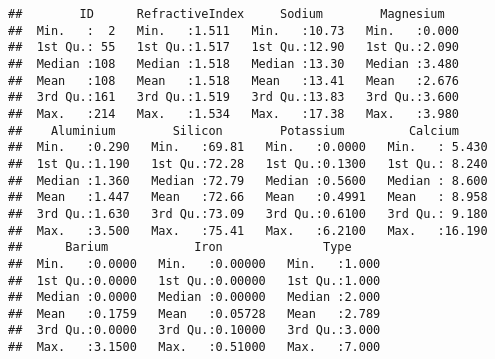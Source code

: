 \documentclass[]{article}
\newenvironment{Shaded}{\begin{snugshade}}{\end{snugshade}}
\newcommand{\KeywordTok}[1]{\textcolor[rgb]{0.13,0.29,0.53}{\textbf{#1}}}
\newcommand{\DataTypeTok}[1]{\textcolor[rgb]{0.13,0.29,0.53}{#1}}
\newcommand{\DecValTok}[1]{\textcolor[rgb]{0.00,0.00,0.81}{#1}}
\newcommand{\StringTok}[1]{\textcolor[rgb]{0.31,0.60,0.02}{#1}}
\newcommand{\CommentTok}[1]{\textcolor[rgb]{0.56,0.35,0.01}{\textit{#1}}}
\newcommand{\OperatorTok}[1]{\textcolor[rgb]{0.81,0.36,0.00}{\textbf{#1}}}
\newcommand{\NormalTok}[1]{#1}
\begin{document}
\begin{verbatim}
##        ID      RefractiveIndex     Sodium        Magnesium    
##  Min.   :  2   Min.   :1.511   Min.   :10.73   Min.   :0.000  
##  1st Qu.: 55   1st Qu.:1.517   1st Qu.:12.90   1st Qu.:2.090  
##  Median :108   Median :1.518   Median :13.30   Median :3.480  
##  Mean   :108   Mean   :1.518   Mean   :13.41   Mean   :2.676  
##  3rd Qu.:161   3rd Qu.:1.519   3rd Qu.:13.83   3rd Qu.:3.600  
##  Max.   :214   Max.   :1.534   Max.   :17.38   Max.   :3.980  
##    Aluminium        Silicon        Potassium         Calcium      
##  Min.   :0.290   Min.   :69.81   Min.   :0.0000   Min.   : 5.430  
##  1st Qu.:1.190   1st Qu.:72.28   1st Qu.:0.1300   1st Qu.: 8.240  
##  Median :1.360   Median :72.79   Median :0.5600   Median : 8.600  
##  Mean   :1.447   Mean   :72.66   Mean   :0.4991   Mean   : 8.958  
##  3rd Qu.:1.630   3rd Qu.:73.09   3rd Qu.:0.6100   3rd Qu.: 9.180  
##  Max.   :3.500   Max.   :75.41   Max.   :6.2100   Max.   :16.190  
##      Barium            Iron              Type      
##  Min.   :0.0000   Min.   :0.00000   Min.   :1.000  
##  1st Qu.:0.0000   1st Qu.:0.00000   1st Qu.:1.000  
##  Median :0.0000   Median :0.00000   Median :2.000  
##  Mean   :0.1759   Mean   :0.05728   Mean   :2.789  
##  3rd Qu.:0.0000   3rd Qu.:0.10000   3rd Qu.:3.000  
##  Max.   :3.1500   Max.   :0.51000   Max.   :7.000
\end{verbatim}

\begin{Shaded}
\end{Shaded}
\end{document}
